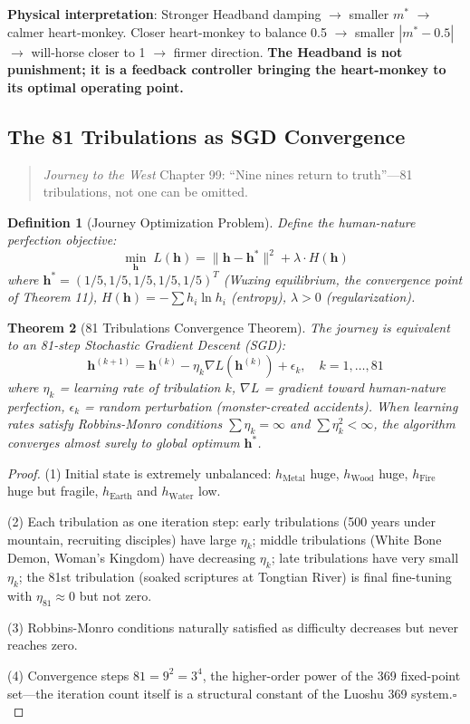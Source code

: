 \documentclass[conference]{IEEEtran}
\newtheorem{theorem}{Theorem}[section]
\newtheorem{definition}[theorem]{Definition}
\theoremstyle{remark}
\begin{document}
\textbf{Physical interpretation}: Stronger Headband damping $\to$ smaller $m^*$ $\to$ calmer heart-monkey. Closer heart-monkey to balance 0.5 $\to$ smaller $|m^*-0.5|$ $\to$ will-horse closer to 1 $\to$ firmer direction. \textbf{The Headband is not punishment; it is a feedback controller bringing the heart-monkey to its optimal operating point.}

\subsection{The 81 Tribulations as SGD Convergence}

\begin{quote}
\emph{Journey to the West} Chapter 99: ``Nine nines return to truth''---81 tribulations, not one can be omitted.
\end{quote}

\begin{definition}[Journey Optimization Problem]
Define the human-nature perfection objective:
\[
\min_{\mathbf{h}} \; L(\mathbf{h}) = \|\mathbf{h} - \mathbf{h}^*\|^2 + \lambda \cdot H(\mathbf{h})
\]
where $\mathbf{h}^* = (1/5,1/5,1/5,1/5,1/5)^T$ (Wuxing equilibrium, the convergence point of Theorem 11), $H(\mathbf{h}) = -\sum h_i\ln h_i$ (entropy), $\lambda>0$ (regularization).
\end{definition}

\begin{theorem}[81 Tribulations Convergence Theorem]
The journey is equivalent to an 81-step Stochastic Gradient Descent (SGD):
\[
\mathbf{h}^{(k+1)} = \mathbf{h}^{(k)} - \eta_k \nabla L(\mathbf{h}^{(k)}) + \epsilon_k,\quad k=1,\ldots,81
\]
where $\eta_k$ = learning rate of tribulation $k$, $\nabla L$ = gradient toward human-nature perfection, $\epsilon_k$ = random perturbation (monster-created accidents). When learning rates satisfy Robbins-Monro conditions $\sum\eta_k=\infty$ and $\sum\eta_k^2<\infty$, the algorithm converges almost surely to global optimum $\mathbf{h}^*$.
\end{theorem}
\begin{proof}
(1) Initial state is extremely unbalanced: $h_{\text{Metal}}$ huge, $h_{\text{Wood}}$ huge, $h_{\text{Fire}}$ huge but fragile, $h_{\text{Earth}}$ and $h_{\text{Water}}$ low.

(2) Each tribulation as one iteration step: early tribulations (500 years under mountain, recruiting disciples) have large $\eta_k$; middle tribulations (White Bone Demon, Woman's Kingdom) have decreasing $\eta_k$; late tribulations have very small $\eta_k$; the 81st tribulation (soaked scriptures at Tongtian River) is final fine-tuning with $\eta_{81}\approx 0$ but not zero.

(3) Robbins-Monro conditions naturally satisfied as difficulty decreases but never reaches zero.

(4) Convergence steps $81 = 9^2 = 3^4$, the higher-order power of the 369 fixed-point set---the iteration count itself is a structural constant of the Luoshu 369 system.\hfill$\square$
\end{proof}
\end{document}
